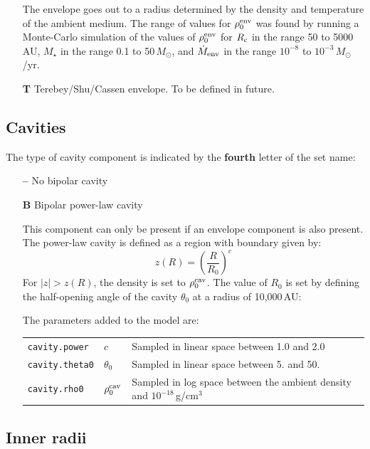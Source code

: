\documentclass[10pt]{article}
\newcommand{\mdote}{\dot{M}_{\rm env}}
\newcommand{\mstar}{M_\star}
\newcommand{\msun}{M_\odot}
\newcommand{\rc}{R_{\rm c}}
\begin{document}
\begin{itemize}
The envelope goes out to a radius determined by the density and temperature of the ambient medium. The range of values for 
$\rho_0^{\rm env}$ was found by running a Monte-Carlo simulation of the values of $\rho_0^{\rm env}$ for $\rc$ in the range 50 to 5000\,AU, $\mstar$ in the range 0.1 to 50\,$\msun$, and $\mdote$ in the range $10^{-8}$ to $10^{-3}$\,$\msun$/yr.

\item[\textbf{T}] Terebey/Shu/Cassen envelope. To be defined in future.

\end{itemize}

\subsection{Cavities}

The type of cavity component is indicated by the \textbf{fourth} letter of the set name:

\begin{itemize}

\item[\textbf{--}] No bipolar cavity
\item[\textbf{B}] Bipolar power-law cavity

This component can only be present if an envelope component is also present. The power-law cavity is defined as a region with boundary given by:
$$
z(R) = \left(\frac{R}{R_0}\right)^c
$$
For $|z| > z(R)$, the density is set to $\rho_0^{\rm cav}$. The value of $R_0$ is set by defining the half-opening angle of the cavity $\theta_0$ at a radius of 10,000\,AU:

The parameters added to the model are:

\begin{center}
  \begin{tabular}{llp{4in}}
    \texttt{cavity.power} & $c$ & Sampled in linear space between 1.0 and 2.0 \\
    \texttt{cavity.theta0} & $\theta_0$ & Sampled in linear space between 5. and 50. \\
    \texttt{cavity.rho0} & $\rho_0^{\rm cav} $ & Sampled in log space between the ambient density and $10^{-18}$\,g/cm$^3$\\
  \end{tabular}
\end{center}

\end{itemize}

\subsection{Inner radii}
\end{document}
